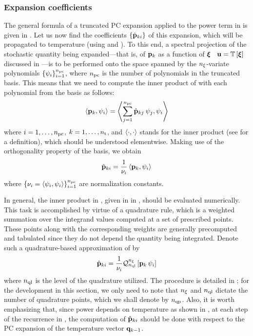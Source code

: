 \subsubsection{Expansion coefficients} 
The general formula of a truncated PC expansion applied to the power term in  is given in .
Let us now find the coefficients $\{ \hat{\mathbf{p}}_{ki} \}$ of this expansion, which will be propagated to temperature (using  and ).
To this end, a spectral projection of the stochastic quantity being expanded---that is, of $\mathbf{p}_k$ as a function of $\boldsymbol{\xi}$ \via\ $\vU = \oTransform{\vZ}$ discussed in ---is to be performed onto the space spanned by the ${n_\xi}$-variate polynomials $\{ \psi_i \}_{i = 1}^{{n_\text{pc}}}$, where ${n_\text{pc}}$ is the number of polynomials in the truncated basis.
This means that we need to compute the inner product of  with each polynomial from the basis as follows:
\[
  \oInner{\vP_k}{\pcb_i} = \oInner{\sum_{j=1}^{\pcterms} \pcc{\vP}_{kj} \: \pcb_j}{\pcb_i}
\]
where $i = 1, \dotsc, {n_\text{pc}}$, $k = 1, \dotsc, {n_\text{t}}$, and $\oInner{\cdot}{\cdot}$ stands for the inner product (see  for a definition), which should be understood elementwise.
Making use of the orthogonality property of the basis, we obtain
\begin{equation} \elabel{pc-coefficients}
  \pcc{\vP}_{ki} = \frac{1}{\pcn_i} \oInner{\vP_k}{\pcb_i}
\end{equation}
where $\{ \pcn_i = \oInner{\pcb_i}{\pcb_i} \}_{i = 1}^\pcterms$ are normalization constants.

In general, the inner product in , given in  in , should be evaluated numerically.
This task is accomplished by virtue of a quadrature rule, which is a weighted summation over the integrand values computed at a set of prescribed points.
These points along with the corresponding weights are generally precomputed and tabulated since they do not depend the quantity being integrated.
Denote such a quadrature-based approximation of  by
\begin{equation} \elabel{pc-coefficients-quadrature}
  \pcc{\vP}_{ki} = \frac{1}{\pcn_i} \oQuad{\nvars}{\qdlevel}{\vP_k \, \pcb_i}
\end{equation}
where ${n_\text{ql}}$ is the level of the quadrature utilized.
The procedure is detailed in ; for the development in this section, we only need to note that ${n_\xi}$ and ${n_\text{ql}}$ dictate the number of quadrature points, which we shall denote by ${n_\text{qp}}$.
Also, it is worth emphasizing that, since power depends on temperature as shown in , at each step of the recurrence in , the computation of $\hat{\mathbf{p}}_{ki}$ should be done with respect to the PC expansion of the temperature vector $\mathbf{q}_{k - 1}$.

